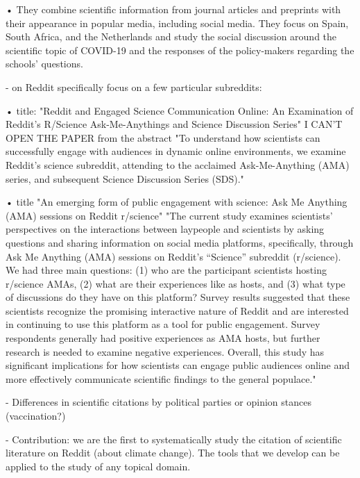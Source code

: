 \begin{itemize}
• \cite{nane2021role} They combine scientific information from journal articles and preprints with their appearance in popular media, including social media. They focus on Spain, South Africa, and the Netherlands and study the social discussion around the scientific topic of COVID-19 and the responses of the policy-makers regarding the schools’ questions.






- on Reddit specifically 
focus  on a few particular subreddits: 

• \cite{moriarty2024reddit} title: "Reddit and Engaged Science Communication Online: An Examination of Reddit's R/Science Ask-Me-Anythings and Science Discussion Series" I CAN'T OPEN THE PAPER from the abstract "To understand how scientists can successfully engage with audiences in dynamic online environments, we examine Reddit’s science subreddit, attending to the acclaimed Ask-Me-Anything (AMA) series, and subsequent Science Discussion Series (SDS)."

• \cite{hara2019emerging} title "An emerging form of public engagement with science: Ask Me Anything (AMA) sessions on Reddit r/science"  "The current study examines scientists’ perspectives on the interactions between laypeople and scientists by asking questions and sharing information on social media platforms, specifically, through Ask Me Anything (AMA) sessions on Reddit’s “Science” subreddit (r/science). We had three main questions: (1) who are the participant scientists hosting r/science AMAs, (2) what are their experiences like as hosts, and (3) what type of discussions do they have on this platform? Survey results suggested that these scientists recognize the promising interactive nature of Reddit and are interested in continuing to use this platform as a tool for public engagement. Survey respondents generally had positive experiences as AMA hosts, but further research is needed to examine negative experiences. Overall, this study has significant implications for how scientists can engage public audiences online and more effectively communicate scientific findings to the general populace." 



- Differences in scientific citations by political parties or opinion stances (vaccination?)

- Contribution: we are the first to systematically study the citation of scientific literature on Reddit (about climate change). The tools that we develop can be applied to the study of any topical domain.\\


\end{itemize}
